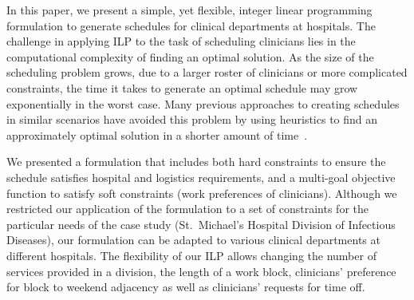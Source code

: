 In this paper, we present a simple, yet flexible, integer linear programming
formulation to generate schedules for clinical departments at hospitals.
The challenge in applying ILP to the task of scheduling clinicians lies in the
computational complexity of finding an optimal solution. As the size of the
scheduling problem grows, due to a larger roster of clinicians or more
complicated constraints, the time it takes to generate an optimal schedule may
grow exponentially in the worst case.
Many previous approaches to creating schedules in similar scenarios have avoided
this problem by using heuristics to find an approximately optimal solution 
in a shorter amount of time~\cite{burke_state_2004}.


We presented a formulation that includes both hard constraints to ensure the
schedule satisfies hospital and logistics requirements, and a multi-goal
objective function to satisfy soft constraints (work preferences of clinicians).
Although we restricted our application of the formulation to a set of
constraints for the particular needs of the case study (St.\ Michael's Hospital
Division of Infectious Diseases), our formulation can be adapted to various
clinical departments at different hospitals. The flexibility of our ILP allows
changing the number of services provided in a division, the length of a work
block, clinicians' preference for block to weekend adjacency as well as
clinicians' requests for time off.

